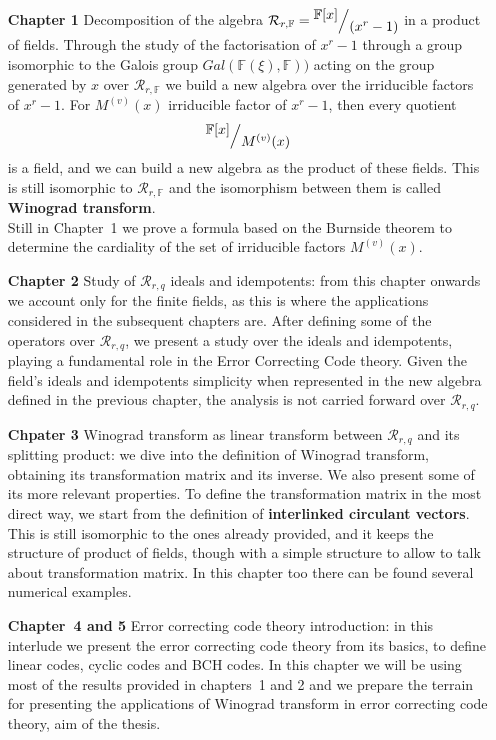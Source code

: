 \begin{enumerate}
   \item[{\bf Chapter 1}] Decomposition of the algebra $\mathcal{R}_{r,\mathbb{F}} = \quotient{ \mathbb{F}[x] }{ (x^r -1 )} $ in a product of fields. Through the study of the factorisation of $x^r -1$ through a group isomorphic to the Galois group $Gal(\mathbb{F}(\xi), \mathbb{F}))$ acting on the group generated by $x$ over $\mathcal{R}_{r,\mathbb{F}} $ we build a new algebra over the irriducible factors of $x^r -1$. For $M^{(v)}(x)$ irriducible factor of $x^r -1$, then every quotient
   \begin{align*}
      \quotient{ \mathbb{F}[x] }{ M^{(v)}(x) }
   \end{align*}
   is a field, and we can build a new algebra as the product of these fields. This is still isomorphic to  $\mathcal{R}_{r,\mathbb{F}}$ and the isomorphism between them is called {\bf Winograd transform}.\\
   Still in Chapter~1 we prove a formula based on the Burnside theorem to determine the cardiality of the set of irriducible factors $M^{(v)}(x)$.
   
   \item[{\bf Chapter 2}] Study of $\mathcal{R}_{r,q}$ ideals and idempotents: from this chapter onwards we account only for the finite fields, as this is where the applications considered in the subsequent chapters are. After defining some of the operators over $\mathcal{R}_{r,q}$, we present a study over the ideals and idempotents, playing a fundamental role in the Error Correcting Code theory. Given the field's ideals and idempotents simplicity when represented in the new algebra defined in the previous chapter, the analysis is not carried forward over  $\mathcal{R}_{r,q}$.
   
   \item[{\bf Chpater 3}] Winograd transform as linear transform between $\mathcal{R}_{r,q}$ and its splitting product: we dive into the definition of Winograd transform, obtaining its transformation matrix and its inverse. We also present some of its more relevant properties.
   To define the transformation matrix in the most direct way, we start from the definition of {\bf interlinked circulant vectors}. This is still isomorphic to the ones already provided, and it keeps the structure of product of fields, though with a simple structure to allow to talk about transformation matrix. In this chapter too there can be found several numerical examples.
   
   \item[{\bf Chapter~4 and 5}] 
   Error correcting code theory introduction: in this interlude we present the error correcting code theory from its basics, to define linear codes, cyclic codes and BCH codes. In this chapter we will be using most of the results provided in chapters~1 and 2 and we prepare the terrain for presenting the applications of Winograd transform in error correcting code theory, aim of the thesis.
   

\end{enumerate}
